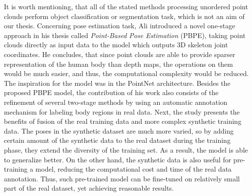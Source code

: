 \noindent It is worth mentioning, that all of the stated methods processing unordered point clouds perform object classification or segmentation task, which is not an aim of our thesis. Concerning pose estimation task, Ali \cite{Ali19} introduced a novel one-stage approach in his thesis called \textit{Point-Based Pose Estimation} (PBPE), taking point clouds directly as input data to the model which outputs 3D skeleton joint coordinates. He concludes, that since point clouds are able to provide sparser representation of the human body than depth maps, the operations on them would be much easier, and thus, the computational complexity would be reduced. The inspiration for the model was in the PointNet architecture. Besides the proposed PBPE model, the contribution of his work also consists of the refinement of several two-stage methods by using an automatic annotation mechanism for labeling body regions in real data. Next, the study presents the benefits of fusion of the real training data and more complex synthetic training data. The poses in the synthetic dataset are much more varied, so by adding certain amount of the synthetic data to the real dataset during the training phase, they extend the diversity of the training set. As a result, the model is able to generalize better. On the other hand, the synthetic data is also useful for pre-training a model, reducing the computational cost and time of the real data annotation. Thus, such pre-trained model can be fine-tuned on relatively small part of the real dataset, yet achieving reasonable results. \par





